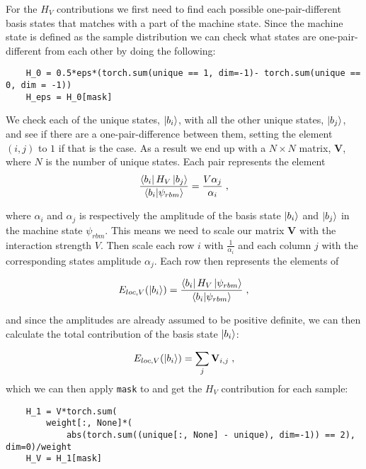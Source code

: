 For the $H_V$ contributions we first need to find each possible one-pair-different basis states that matches with a part of the machine state. Since the machine state is defined as the sample distribution we can check what states are one-pair-different from each other by doing the following:

\begin{verbatim} 
    H_0 = 0.5*eps*(torch.sum(unique == 1, dim=-1)- torch.sum(unique == 0, dim = -1))
    H_eps = H_0[mask]
\end{verbatim}

We check each of the unique states, $\ket{b_i}$, with all the other unique states, $\ket{b_j}$, and see if there are a one-pair-difference between them, setting the element $\left (i, j \right )$ to $1$ if that is the case. As a result we end up with a $N\times N$ matrix, $\mathbf{V}$, where $N$ is the number of unique states. Each pair represents the element
\begin{equation}
  \frac{\bra{b_i}H_V\ket{b_j}}{\braket{b_i}{\psi_{rbm}}} = \frac{V\alpha_j}{\alpha_i} \; ,
  \label{eq:LMG_imp_V_cont}
\end{equation}

where $\alpha_i$ and $\alpha_j$ is respectively the amplitude of the basis state $\ket{b_i}$ and $\ket{b_j}$ in the machine state $\psi_{rbm}$. This means we need to scale our matrix $\mathbf{V}$ with the interaction strength $V$. Then scale each row $i$ with $\frac{1}{\alpha_i}$ and each column $j$ with the corresponding states amplitude $\alpha_j$. Each row then represents the elements of 

$$ E_{loc, V}(\ket{b_i}) = \frac{\bra{b_i}H_V\ket{\psi_{rbm}}}{\braket{b_i}{\psi_{rbm}}} \; , $$

and since the amplitudes are already assumed to be positive definite, we can then calculate the total contribution of the basis state $\ket{b_i}$:

\begin{equation}
 E_{loc, V}(\ket{b_i})= \sum_j \mathbf{V}_{i,j} \; ,
\end{equation}
which we can then apply \texttt{mask} to and get the $H_V$ contribution for each sample:

\begin{verbatim}
    H_1 = V*torch.sum(
        weight[:, None]*(
            abs(torch.sum((unique[:, None] - unique), dim=-1)) == 2), dim=0)/weight
    H_V = H_1[mask]
\end{verbatim}

